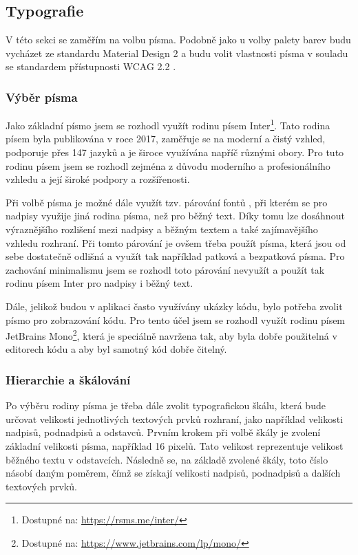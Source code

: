 \subsection{Typografie}

V této sekci se zaměřím na volbu písma. Podobně jako u volby palety barev budu vycházet ze standardu Material Design 2 a budu volit vlastnosti písma v souladu se standardem přístupnosti WCAG 2.2 \cite{WCAG22}.

\subsubsection{Výběr písma}

Jako základní písmo jsem se rozhodl využít rodinu písem Inter\footnote{Dostupné na: \href{https://rsms.me/inter/}{https://rsms.me/inter/}}. Tato rodina písem byla publikována v roce 2017, zaměřuje se na moderní a čistý vzhled, podporuje přes 147 jazyků a je široce využívána napříč různými obory. Pro tuto rodinu písem jsem se rozhodl zejména z důvodu moderního a profesionálního vzhledu a její široké podpory a rozšířenosti. \cite{Inter}

Při volbě písma je možné dále využít tzv. párování fontů \cite[271-272]{Tidwell2020DesigningInterfaces}, při kterém se pro nadpisy využije jiná rodina písma, než pro běžný text. Díky tomu lze dosáhnout výraznějšího rozlišení mezi nadpisy a běžným textem a také zajímavějšího vzhledu rozhraní. Při tomto párování je ovšem třeba použít písma, která jsou od sebe dostatečně odlišná a využít tak například patková a bezpatková písma. Pro zachování minimalismu jsem se rozhodl toto párování nevyužít a použít tak rodinu písem Inter pro nadpisy i běžný text.

Dále, jelikož budou v aplikaci často využívány ukázky kódu, bylo potřeba zvolit písmo pro zobrazování kódu. Pro tento účel jsem se rozhodl využít rodinu písem JetBrains Mono\footnote{Dostupné na: \href{https://www.jetbrains.com/lp/mono/}{https://www.jetbrains.com/lp/mono/}}, která je speciálně navržena tak, aby byla dobře použitelná v editorech kódu a aby byl samotný kód dobře čitelný. \cite{JetBrainsMono}

\subsubsection{Hierarchie a škálování}

Po výběru rodiny písma je třeba dále zvolit typografickou škálu, která bude určovat velikosti jednotlivých textových prvků rozhraní, jako například velikosti nadpisů, podnadpisů a odstavců. Prvním krokem při volbě škály je zvolení základní velikosti písma, například 16 pixelů. Tato velikost reprezentuje velikost běžného textu v odstavcích. Následně se, na základě zvolené škály, toto číslo násobí daným poměrem, čímž se získají velikosti nadpisů, podnadpisů a dalších textových prvků.

